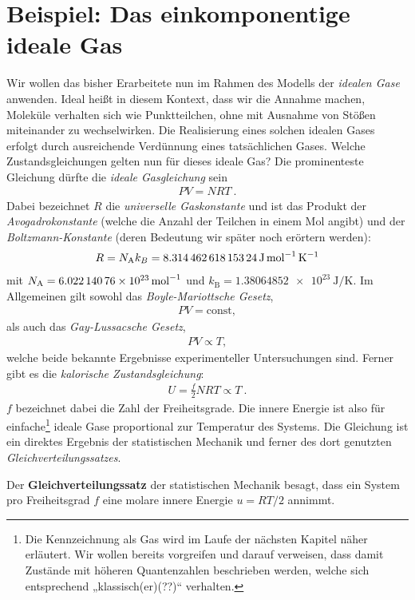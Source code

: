 \section{Beispiel: Das einkomponentige ideale Gas}
Wir wollen das bisher Erarbeitete nun im Rahmen des Modells der \emph{idealen Gase} anwenden. Ideal heißt in diesem Kontext, dass wir die Annahme machen, Moleküle verhalten sich wie Punktteilchen, ohne \textendash{} mit Ausnahme von Stößen \textendash{} miteinander zu wechselwirken. Die Realisierung eines solchen idealen Gases erfolgt durch ausreichende Verdünnung eines tatsächlichen Gases.
Welche Zustandsgleichungen gelten nun für dieses ideale Gas?
Die prominenteste Gleichung dürfte die \emph{ideale Gasgleichung} sein
\begin{align*}
    \boxed{PV=NRT}\:.
\end{align*}
Dabei bezeichnet $R$ die \emph{universelle Gaskonstante} und ist das Produkt der \emph{Avogadrokonstante} (welche die Anzahl der Teilchen in einem Mol angibt) und der \emph{Boltzmann-Konstante} (deren Bedeutung wir später noch erörtern werden):
\begin{align*}
    R=N_\mathrm{A} k_B=\SI{ 8,314 462 618 153 24}{\joule\per\mole\per\kelvin}
\end{align*}
mit $N_\mathrm{A}=\SI{6,02214076e23}{\per\mole}$ und $k_\mathrm{B}=\SI{1,38064852e23}{\joule\per\kelvin}$. 
Im Allgemeinen gilt sowohl das \emph{Boyle-Mariottsche Gesetz},
\begin{align*}
    PV=\mathrm{const},
\end{align*}
als auch das \emph{Gay-Lussacsche Gesetz},
\begin{align*}
    PV\propto T,
\end{align*}
welche beide bekannte Ergebnisse experimenteller Untersuchungen sind.
Ferner gibt es die \emph{kalorische Zustandsgleichung}:
\begin{align*}
    \boxed{U=\frac{f}{2}NRT\propto T}\:.
\end{align*}
$f$ bezeichnet dabei die Zahl der Freiheitsgrade. Die innere Energie ist also für einfache\footnote{Die Kennzeichnung als  Gas wird im Laufe der nächsten Kapitel näher erläutert. Wir wollen bereits vorgreifen und darauf verweisen, dass damit Zustände mit höheren Quantenzahlen beschrieben werden, welche sich entsprechend „klassisch(er)(??)“ verhalten.} ideale Gase proportional zur Temperatur des Systems.
Die Gleichung ist ein direktes Ergebnis der statistischen Mechanik und ferner des dort genutzten \emph{Gleichverteilungssatzes}.
\begin{formal}
    Der \textbf{Gleichverteilungssatz} der statistischen Mechanik besagt, dass ein System pro Freiheitsgrad $f$ eine molare innere Energie $u=RT/2$ annimmt.
\end{formal}

